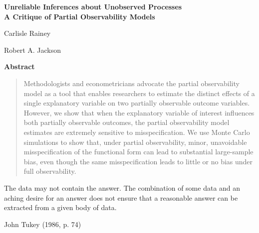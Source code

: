 \documentclass[10pt]{article}
\begin{document}
\begin{center}
{\LARGE \textbf{Unreliable Inferences about Unobserved Processes}\\\vspace{2mm}
{\large \textbf{A Critique of Partial Observability Models}}}

\vspace{10mm}

Carlisle Rainey

\vspace{3mm}

Robert A. Jackson
\end{center}

\vspace{10mm}

{\centerline{\textbf{Abstract}}}
\begin{quote}\noindent
Methodologists and econometricians advocate the partial observability model as a tool that enables researchers to estimate the distinct effects of a single explanatory variable on two partially observable outcome variables. 
However, we show that when the explanatory variable of interest influences both partially observable outcomes, the partial observability model estimates are extremely sensitive to misspecification. 
We use Monte Carlo simulations to show that, under partial observability, minor, unavoidable misspecification of the functional form can lead to substantial large-sample bias, even though the same misspecification leads to little or no bias under full observability.
 \end{quote}
\vspace{10mm}
\epigraph{The data may not contain the answer. The combination of some data and an 
aching desire for an answer does not ensure that a reasonable answer can be extracted from a given body of data.}{John Tukey (1986, p. 74)}
\end{document}
